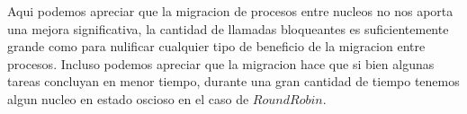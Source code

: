 Aqui podemos apreciar que la migracion de procesos entre nucleos no nos aporta una mejora significativa, la cantidad de llamadas bloqueantes es suficientemente grande como para nulificar cualquier tipo de beneficio de la migracion entre procesos. Incluso podemos apreciar que la migracion hace que si bien algunas tareas concluyan en menor tiempo, durante una gran cantidad de tiempo tenemos algun nucleo en estado oscioso en el caso de $Round Robin$.
